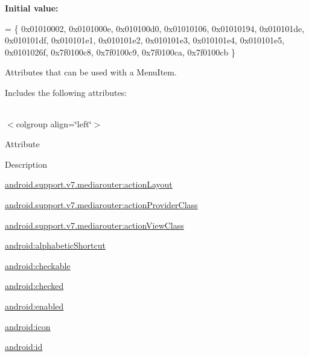 {\bfseries Initial value\+:}
\begin{DoxyCode}
= \{
            0x01010002, 0x0101000e, 0x010100d0, 0x01010106,
            0x01010194, 0x010101de, 0x010101df, 0x010101e1,
            0x010101e2, 0x010101e3, 0x010101e4, 0x010101e5,
            0x0101026f, 0x7f0100c8, 0x7f0100c9, 0x7f0100ca,
            0x7f0100cb
        \}
\end{DoxyCode}
Attributes that can be used with a Menu\+Item. 

Includes the following attributes\+:

\tabulinesep=1mm
\begin{longtabu} spread 0pt [c]{*{0}{|X[-1]}|}
\hline
\end{longtabu}
$<$colgroup align=\char`\"{}left\char`\"{}$>$ 

Attribute

Description 

{\ttfamily \hyperlink{classandroid_1_1support_1_1v7_1_1mediarouter_1_1R_1_1styleable_a78482ce9b7b1a984cf7dcd025dda397f}{android.\+support.\+v7.\+mediarouter\+:action\+Layout}}

{\ttfamily \hyperlink{classandroid_1_1support_1_1v7_1_1mediarouter_1_1R_1_1styleable_ae72dd8fd6d8d6b80d2966548a77910e2}{android.\+support.\+v7.\+mediarouter\+:action\+Provider\+Class}}

{\ttfamily \hyperlink{classandroid_1_1support_1_1v7_1_1mediarouter_1_1R_1_1styleable_a545b5468a5f0d9703946118b0bd71bc3}{android.\+support.\+v7.\+mediarouter\+:action\+View\+Class}}

{\ttfamily \hyperlink{classandroid_1_1support_1_1v7_1_1mediarouter_1_1R_1_1styleable_a8ac2af9738b8960cf827ec83b5170112}{android\+:alphabetic\+Shortcut}}

{\ttfamily \hyperlink{classandroid_1_1support_1_1v7_1_1mediarouter_1_1R_1_1styleable_a9589fc6eccc92b23929e6514ff607f33}{android\+:checkable}}

{\ttfamily \hyperlink{classandroid_1_1support_1_1v7_1_1mediarouter_1_1R_1_1styleable_a5f9110ca34955eafc1b143d24ae94ff9}{android\+:checked}}

{\ttfamily \hyperlink{classandroid_1_1support_1_1v7_1_1mediarouter_1_1R_1_1styleable_a294de794a49feae55004e44239e424db}{android\+:enabled}}

{\ttfamily \hyperlink{classandroid_1_1support_1_1v7_1_1mediarouter_1_1R_1_1styleable_a0c24c2aeee730bc922ae77f16c7943dc}{android\+:icon}}

{\ttfamily \hyperlink{classandroid_1_1support_1_1v7_1_1mediarouter_1_1R_1_1styleable_ab839f8e9d62f6bd107255d2df7efc082}{android\+:id}}

